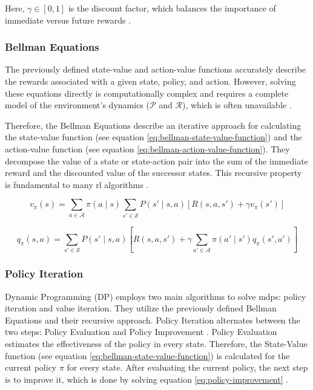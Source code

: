 Here, $\gamma \in [0, 1]$ is the discount factor, which balances the importance of immediate versus future rewards \cite{sutton_reinforcement_2018}.

\subsubsection{Bellman Equations}
The previously defined state-value and action-value functions accurately describe the rewards associated with a given state, policy, and action.
However, solving these equations directly is computationally complex and requires a complete model of the environment's dynamics ($\mathcal{P}$ and $\mathcal{R}$), which is often unavailable \cite{sutton_reinforcement_2018}.

Therefore, the Bellman Equations describe an iterative approach for calculating the state-value function (see equation \ref{eq:bellman-state-value-function}) and the action-value function (see equation \ref{eq:bellman-action-value-function}).
They decompose the value of a state or state-action pair into the sum of the immediate reward and the discounted value of the successor states.
This recursive property is fundamental to many \gls{rl} algorithms \cite{zhang_dive_2023}.

\begin{equation}\label{eq:bellman-state-value-function}
v_\pi(s) = \sum_{a \in \mathcal{A}} \pi(a \mid s) \sum_{s' \in \mathcal{S}} P(s' \mid s, a) \left[ R(s, a, s') + \gamma v_\pi(s') \right]
\end{equation}

\begin{equation}\label{eq:bellman-action-value-function}
q_\pi(s, a) = \sum_{s' \in \mathcal{S}} P(s' \mid s, a) \left[ R(s, a, s') + \gamma \sum_{a' \in \mathcal{A}} \pi(a' \mid s') q_\pi(s', a') \right]
\end{equation}

\subsubsection{Policy Iteration}
Dynamic Programming (DP) employs two main algorithms to solve \glspl{mdp}: policy iteration and value iteration.
They utilize the previously defined Bellman Equations and their recursive approach.
Policy Iteration alternates between the two steps: Policy Evaluation and Policy Improvement \cite{sutton_reinforcement_2018}.
Policy Evaluation estimates the effectiveness of the policy in every state.
Therefore, the State-Value function (see equation \ref{eq:bellman-state-value-function}) is calculated for the current policy $\pi$ for every state.
After evaluating the current policy, the next step is to improve it, which is done by solving equation \ref{eq:policy-improvement} \cite{zhang_dive_2023}.

